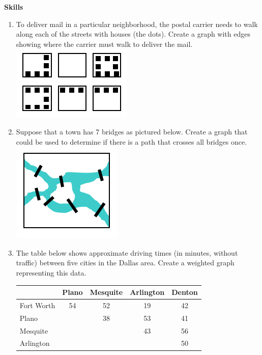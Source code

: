 \textbf{Skills}
\begin{enumerate}
\item	To deliver mail in a particular neighborhood, the postal carrier needs to walk along each of the streets with houses (the dots).  Create a graph with edges showing where the carrier must walk to deliver the mail.\\

\includegraphics{graph-theory-graphics/GraphExercise1.png}\\

\item	Suppose that a town has 7 bridges as pictured below.  Create a graph that could be used to determine if there is a path that crosses all bridges once.\\

\includegraphics{graph-theory-graphics/GraphExercise2.png}\\

\item	The table below shows approximate driving times (in minutes, without traffic) between five cities in the Dallas area.  Create a weighted graph representing this data.
\begin{center}
\begin{tabular}{|l|c|c|c|c|}
\hline
&Plano&Mesquite&Arlington&Denton\\
\hline
Fort Worth&54&52&19&42\\
\hline
Plano&&38&53&41\\
\hline
Mesquite&&&43&56\\
\hline
Arlington&&&&50\\
\hline
\end{tabular}
\end{center}


\end{enumerate}
